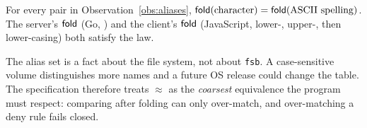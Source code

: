\begin{law}
\label{law:fold-aliases}
For every pair in Observation~\ref{obs:aliases},
$\mathsf{fold}(\text{character})=\mathsf{fold}(\text{ASCII spelling})$.  The server's $\mathsf{fold}$
(Go, ) and the client's $\mathsf{fold}$ (JavaScript,
lower-, upper-, then lower-casing) both satisfy the law.
\end{law}

\begin{boundary}
\label{bnd:volume}
The alias set is a fact about the file system, not about \texttt{fsb}.  A
case-sensitive volume distinguishes more names and a future OS release could
change the table.  The specification therefore treats $\approx$ as the
\emph{coarsest} equivalence the program must respect: comparing after folding
can only over-match, and over-matching a deny rule fails closed.
\end{boundary}
